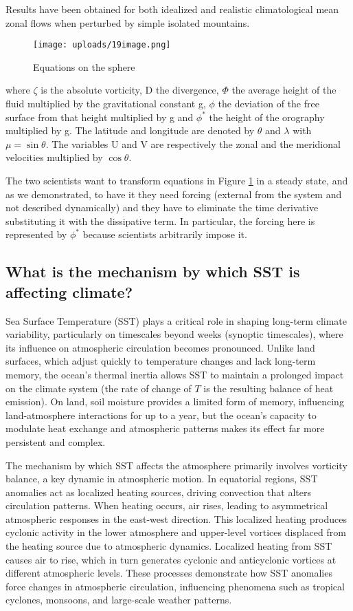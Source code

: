 Results have been obtained for both idealized and realistic climatological mean zonal flows when perturbed by simple isolated mountains.

\begin{figure}[htp!]
	\centering
	\texttt{[image: uploads/19image.png]}
	\caption{Equations on the sphere}
	\label{fig: fig 2.2}

\end{figure}
where $\zeta$ is the absolute vorticity, D the divergence, $\Phi$
the average height of the fluid multiplied by the gravitational constant g, $\phi$ the deviation of the free surface from that height multiplied by g and $\phi^*$ the height of the orography multiplied by g. The latitude and longitude are denoted by $\theta$ and $\lambda$ with $\mu = \sin \theta$. The variables U and V are respectively the zonal and the meridional velocities multiplied by $\cos \theta$.


The two scientists want to transform equations in Figure \ref{fig: fig 2.2} in a steady state, and as we demonstrated, to have it they need forcing (external from the system and not described dynamically) and they have to eliminate the time derivative substituting it with the dissipative term.
In particular, the forcing here is represented by $\phi^*$ because scientists arbitrarily impose it.

\subsection{What is the mechanism by which SST is affecting climate?}

Sea Surface Temperature (SST) plays a critical role in shaping long-term climate variability, particularly on timescales beyond weeks (synoptic timescales), where its influence on atmospheric circulation becomes pronounced. Unlike land surfaces, which adjust quickly to temperature changes and lack long-term memory, the ocean's thermal inertia allows SST to maintain a prolonged impact on the climate system (the rate of change of $T$ is the resulting balance of heat emission). On land, soil moisture provides a limited form of memory, influencing land-atmosphere interactions for up to a year, but the ocean’s capacity to modulate heat exchange and atmospheric patterns makes its effect far more persistent and complex.

The mechanism by which SST affects the atmosphere primarily involves vorticity balance, a key dynamic in atmospheric motion. In equatorial regions, SST anomalies act as localized heating sources, driving convection that alters circulation patterns. When heating occurs, air rises, leading to asymmetrical atmospheric responses in the east-west direction. This localized heating produces cyclonic activity in the lower atmosphere and upper-level vortices displaced from the heating source due to atmospheric dynamics. Localized heating from SST causes air to rise, which in turn generates cyclonic and anticyclonic vortices at different atmospheric levels.  These processes demonstrate how SST anomalies force changes in atmospheric circulation, influencing phenomena such as tropical cyclones, monsoons, and large-scale weather patterns.


